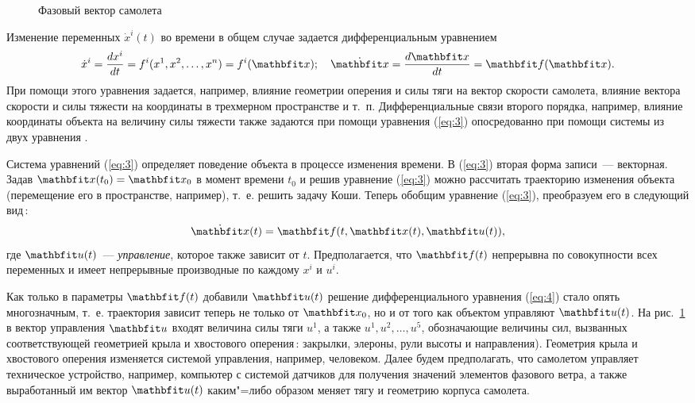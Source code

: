\documentclass[a4paper,14pt, openany, twoside, draft]{extbook} %
\begin{document}
\begin{figure}[bh]
  \centering
  \footnotesize
      \def\xyz{$x^1,x^2,x^3,\;x^4,x^5,x^6$} \def\yaw{$x^7,x^8$} \def\pitch{$x^9,x^{10}$}
      \def\roll{$\!\!\!\!\!\!x^{11},x^{12}$} \def\lift{$x^{13}$} \def\down{$\!\!x^{14}$}
      \def\thrust{$u^1$} \def\rudder{$u^5$} \def\drag{$x^{15}$}
      \def\flaps{$u^2$} \def\aeleron{$u^3$} \def\engine{}
      \def\elevator{$u^4$} \def\svgwidth{0.80\columnwidth}
      
  \caption{Фазовый вектор самолета}
  \label{fig:phasecoords}
\end{figure}

Изменение переменных $\dot{x}^i(t)$ во времени в общем случае задается дифференциальным уравнением
\begin{equation}
  \label{eq:3}
\dot{x}^i=\frac{dx^i}{dt}=f^i(x^1,x^2,\ldots,x^n)=f^i(\vecx);\quad
   \dot{\vecx}=\frac{d\vecx}{dt}=\vecf(\vecx).
\end{equation}
При помощи этого уравнения задается, например, влияние геометрии оперения и силы тяги на вектор скорости самолета, влияние вектора скорости и силы тяжести на координаты в трехмерном пространстве и т.~п.  Дифференциальные связи второго порядка, например, влияние координаты объекта на величину силы тяжести также задаются при помощи уравнения (\ref{eq:3}) опосредованно при помощи системы из двух уравнения \cite{pontr}.

Система уравнений (\ref{eq:3}) определяет поведение объекта в процессе изменения времени.  В (\ref{eq:3}) вторая форма записи~--- векторная.  Задав $\vecx(t_0)=\vecx_0$ в момент времени $t_0$ и решив уравнение (\ref{eq:3}) можно рассчитать траекторию изменения объекта (перемещение его в пространстве, например), т.~е. решить задачу Коши.  Теперь обобщим уравнение (\ref{eq:3}), преобразуем его в следующий вид\,:
\begin{equation}
  \label{eq:4}
  \dot{\vecx}(t)=\vecf(t,\vecx(t),\vecu(t)),
\end{equation}
где $\vecu(t)$~--- \emph{управление}, которое также зависит от $t$.  Предполагается, что $\vecf(t)$ непрерывна по совокупности всех переменных и имеет непрерывные производные по каждому $x^i$ и $u^i$.

Как только в параметры $\vecf(t)$ добавили $\vecu(t)$ решение дифференциального уравнения (\ref{eq:4}) стало опять многозначным, т.~е. траектория зависит теперь не только от $\vecx_0$, но и от того как объектом управляют $\vecu(t)$.  На рис.~\ref{fig:phasecoords} в вектор управления $\vecu$ входят величина силы тяги $u^1$, а также $u^1,u^2,\ldots,u^5$, обозначающие величины сил, вызванных соответствующей геометрией крыла и хвостового оперения\,: закрылки, элероны, рули высоты и направления).  Геометрия крыла и хвостового оперения изменяется системой управления, например, человеком.  Далее будем предполагать, что самолетом управляет техническое устройство, например, компьютер с системой датчиков для получения значений элементов фазового ветра, а также выработанный им вектор $\vecu(t)$ каким"=либо образом меняет тягу и геометрию корпуса самолета.
\end{document}

